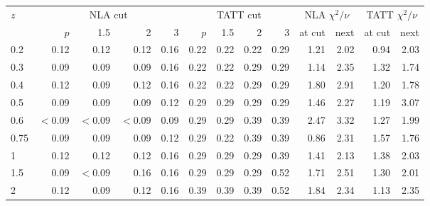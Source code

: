 \begin{tabular}{l rrrr rrrr rr rr}\toprule
$z$ & \multicolumn{4}{c}{NLA cut} & \multicolumn{4}{c}{TATT cut} & \multicolumn{2}{c}{NLA $\chi^2/\nu$} & \multicolumn{2}{c}{TATT $\chi^2/\nu$}\\
\cmidrule(lr){2-5}\cmidrule(lr){6-9}\cmidrule(lr){10-11}\cmidrule(lr){12-13}
 & $p$ & 1.5 & 2 & 3 & $p$ & 1.5 & 2 & 3 & at cut & next & at cut & next\\\midrule
0.2 & 0.12 & 0.12 & 0.12 & 0.16 & 0.22 & 0.22 & 0.22 & 0.29 & 1.21 & 2.02 & 0.94 & 2.03\\
0.3 & 0.09 & 0.09 & 0.09 & 0.16 & 0.22 & 0.22 & 0.29 & 0.29 & 1.14 & 2.35 & 1.32 & 1.74\\
0.4 & 0.12 & 0.09 & 0.12 & 0.16 & 0.22 & 0.22 & 0.29 & 0.29 & 1.80 & 2.91 & 1.20 & 1.78\\
0.5 & 0.09 & 0.09 & 0.09 & 0.12 & 0.29 & 0.29 & 0.29 & 0.29 & 1.46 & 2.27 & 1.19 & 3.07\\
0.6 & $<0.09$ & $<0.09$ & $<0.09$ & 0.09 & 0.29 & 0.29 & 0.39 & 0.39 & 2.47 & 3.32 & 1.27 & 1.99\\
0.75 & 0.09 & 0.09 & 0.09 & 0.12 & 0.29 & 0.22 & 0.39 & 0.39 & 0.86 & 2.31 & 1.57 & 1.76\\
1 & 0.12 & 0.12 & 0.12 & 0.16 & 0.29 & 0.29 & 0.29 & 0.39 & 1.41 & 2.13 & 1.38 & 2.03\\
1.5 & 0.09 & $<0.09$ & 0.16 & 0.16 & 0.29 & 0.29 & 0.29 & 0.52 & 1.71 & 2.51 & 1.30 & 2.01\\
2 & 0.12 & 0.09 & 0.12 & 0.16 & 0.39 & 0.39 & 0.39 & 0.52 & 1.84 & 2.34 & 1.13 & 2.35\\
\bottomrule\end{tabular}